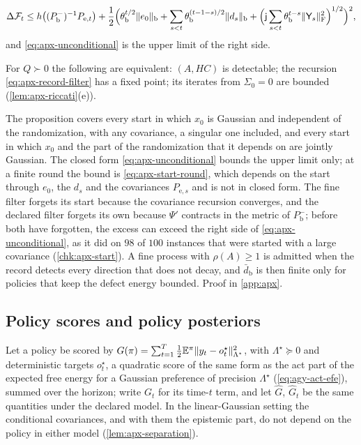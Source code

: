 \begin{proposition}
\begin{enumerate}
\begin{equation}\label{eq:apx-start-round}
\Delta\mathcal F_t\le h\bigl((P^-_{\mathrm b})^{-1}P_{\mathrm e,t}\bigr)+\frac12\Bigl(\theta_{\mathrm b}^{t/2}\Vert e_0\Vert_{\mathrm b}+\sum_{s<t}\theta_{\mathrm b}^{(t-1-s)/2}\Vert d_s\Vert_{\mathrm b}+\Bigl(\mathsf j\sum_{s<t}\theta_{\mathrm b}^{t-s}\Vert\mathsf Y_s\Vert_{\mathrm F}^2\Bigr)^{1/2}\Bigr)^2 ,
\end{equation}
and \eqref{eq:apx-unconditional} is the upper limit of the right side.
\end{enumerate}
For $Q\succ0$ the following are equivalent: $(A,HC)$ is detectable; the recursion \eqref{eq:apx-record-filter} has a fixed point; its iterates from $\Sigma_0=0$ are bounded (\cref{lem:apx-riccati}(e)).
\end{proposition}

The proposition covers every start in which $x_0$ is Gaussian and independent of the randomization, with any covariance, a singular one included, and every start in which $x_0$ and the part of the randomization that it depends on are jointly Gaussian. The closed form \eqref{eq:apx-unconditional} bounds the upper limit only; at a finite round the bound is \eqref{eq:apx-start-round}, which depends on the start through $e_0$, the $d_s$ and the covariances $P_{\mathrm e,s}$ and is not in closed form. The fine filter forgets its start because the covariance recursion converges, and the declared filter forgets its own because $\Psi'$ contracts in the metric of $P^-_{\mathrm b}$; before both have forgotten, the excess can exceed the right side of \eqref{eq:apx-unconditional}, as it did on $98$ of $100$ instances that were started with a large covariance (\cref{chk:apx-start}). A fine process with $\rho(A)\ge1$ is admitted when the record detects every direction that does not decay, and $\bar d_{\mathrm b}$ is then finite only for policies that keep the defect energy bounded. Proof in \cref{app:apx}.

\subsection{Policy scores and policy posteriors}

Let a policy be scored by $G(\pi)=\sum_{t=1}^T\frac12\mathbb{E}^\pi\Vert y_t-o^\star_t\Vert^2_{\Lambda^\star}$, with $\Lambda^\star\succeq0$ and deterministic targets $o^\star_t$, a quadratic score of the same form as the act part of the expected free energy for a Gaussian preference of precision $\Lambda^\star$ (\cref{eq:agy-act-efe}), summed over the horizon; write $G_t$ for its time-$t$ term, and let $\hat G$, $\hat G_t$ be the same quantities under the declared model. In the linear-Gaussian setting the conditional covariances, and with them the epistemic part, do not depend on the policy in either model (\cref{lem:apx-separation}).


